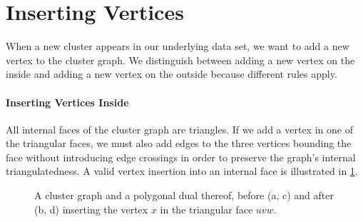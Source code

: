 \section{Inserting Vertices}
\label{sect:inserting-vertices}

When a new cluster appears in our underlying data set, we want to add a new vertex to the cluster graph. We distinguish between adding a new vertex on the inside and adding a new vertex on the outside because different rules apply.



\paragraph{Inserting Vertices Inside}

All internal faces of the cluster graph are triangles. If we add a vertex in one of the triangular faces, we must also add edges to the three vertices bounding the face without introducing edge crossings in order to preserve the graph's internal triangulatedness. A valid vertex insertion into an internal face is illustrated in \cref{fig:insert-vertex-inside-example}.

\begin{figure}[H]
	\centering
	\quad
	\qquad
	\quad
	\caption{A cluster graph and a polygonal dual thereof, before (a, c) and after (b, d) inserting the vertex $x$ in the triangular face $uvw$.}
	\label{fig:insert-vertex-inside-example}
\end{figure}


